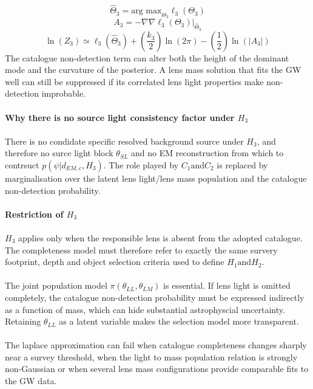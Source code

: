 \documentclass[pdflatex,sn-mathphys-num]{sn-jnl}%
\theoremstyle{thmstyleone}%
\theoremstyle{thmstyletwo}%
\theoremstyle{thmstylethree}%
\begin{document}
\begin{appendices}
\begin{equation}
\hat\Theta_3 = \text{arg max}_{\Theta_3}\ell_3(\Theta_3)
\end{equation}
\begin{equation}
A_3 = -\nabla\nabla\ell_3(\Theta_3)|_{\hat\Theta_3}
\end{equation}
\begin{equation}
\ln(Z_3) \simeq \ell_3(\hat\Theta_3) + (\frac{k_3}{2})\ln(2\pi) - (\frac{1}{2})\ln(|A_3|)
\end{equation}
The catalogue non-detection term can alter both the height of the dominant mode and the curvature of the posterior.
A lens mass solution that fits the GW well can still be suppressed if its correlated lens light properties make non-detection improbable.
\\
\\
\textbf{Why there is no source light consistency factor under $H_3$}\\
\\
There is no condidate specific resolved background source under $H_3$, and therefore no surce light block $\theta_{SL}$ and no EM reconstruction from which to contrsuct $p(\psi|d_{EM,c},H_3)$.
The role played by $C_1 \text{and} C_2$ is replaced by marginalisation over the latent lens light/lens mass population and the catalogue non-detection probability.
\\
\\
\textbf{Restriction of $H_3$}\\
\\
$H_3$ applies only when the responsible lens is absent from the adopted catalogue.
The completeness model must therefore refer to exactly the same survery footprint, depth and object selection criteria used to define $H_1 \text{and} H_2$.\\
\\
The joint population model $\pi(\theta_{LL},\theta_{LM})$ is essential.
If lens light is omitted completely, the catalogue non-detection probability must be expressed indirectly as a function of mass, which can hide substantial astrophyscial uncertainty.
Retaining $\theta_{LL}$ as a latent variable makes the selection model more transparent.\\
\\
The laplace approximation can fail when catalogue completeness changes sharply near a survey threshold, when the light to mass population relation is strongly non-Gaussian or when several lens mass configurations provide comparable fits to the GW data.


\end{appendices}
\end{document}
